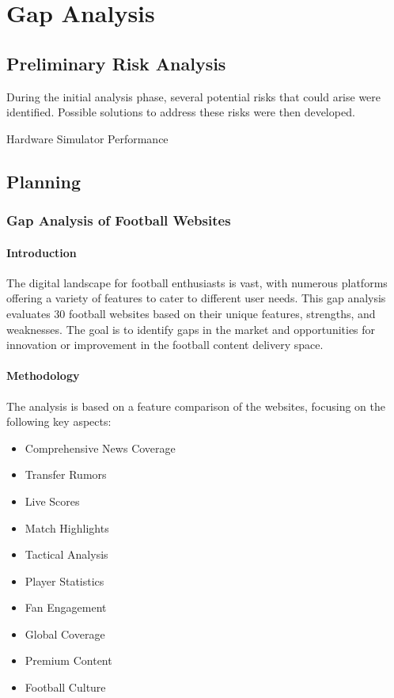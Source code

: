 \chapter{Gap Analysis}
\label{chap:gap-analysis}

\section{Preliminary Risk Analysis}

During the initial analysis phase, several potential risks that could arise were identified.  
Possible solutions to address these risks were then developed.

\begin{risk}{Hardware Simulator Performance}
    \label{risk:hardware-simulator} 
\end{risk}

\section{Planning}

\subsection{Gap Analysis of Football Websites}

\subsubsection{Introduction}
The digital landscape for football enthusiasts is vast, with numerous platforms offering a variety of features to cater to different user needs. This gap analysis evaluates 30 football websites based on their unique features, strengths, and weaknesses. The goal is to identify gaps in the market and opportunities for innovation or improvement in the football content delivery space.

\subsubsection{Methodology}
The analysis is based on a feature comparison of the websites, focusing on the following key aspects:
\begin{itemize}
    \item Comprehensive News Coverage
    \item Transfer Rumors
    \item Live Scores
    \item Match Highlights
    \item Tactical Analysis
    \item Player Statistics
    \item Fan Engagement
    \item Global Coverage
    \item Premium Content
    \item Football Culture
\end{itemize}

